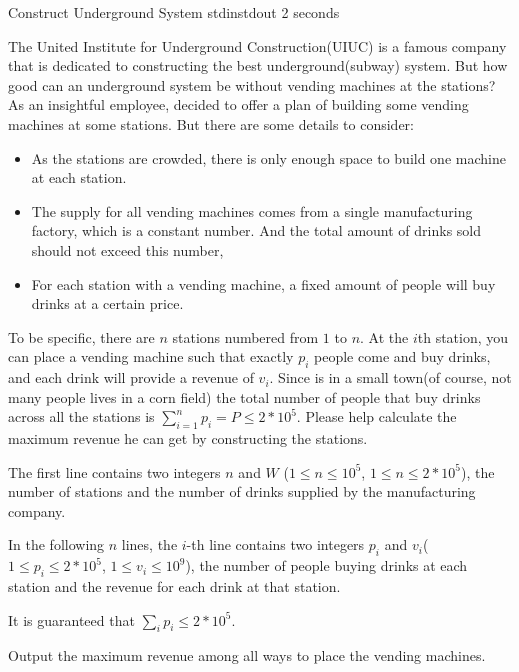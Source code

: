 \begin{problem}{Construct Underground System}
{stdin}{stdout}
{2 seconds}{}{}

The United Institute for Underground Construction(UIUC) is a famous company that is dedicated to constructing the best underground(subway) system. But how good can an underground system be without vending machines at the stations? As an insightful employee, \pittoresque decided to offer a plan of building some vending machines at some stations. But there are some details to consider:
\begin{itemize}
    \item As the stations are crowded, there is only enough space to build one machine at each station.
    \item The supply for all vending machines comes from a single manufacturing factory, which is a constant number. And the total amount of drinks sold should not exceed this number,
    \item For each station with a vending machine, a fixed amount of people will buy drinks at a certain price. 
\end{itemize}

To be specific, there are $n$ stations numbered from $1$ to $n$. At the $i$th station, you can place a vending machine such that exactly $p_i$ people come and buy drinks, and each drink will provide a revenue of $v_i$. Since \pittoresque is in a small town(of course, not many people lives in a corn field) the total number of people that buy drinks across all the stations is $\sum_{i=1}^n p_i = P \leq 2 * 10^5$. Please help \pittoresque calculate the maximum revenue he can get by constructing the stations. 

\InputFile

The first line contains two integers $n$ and $W$ ($1 \le n \le 10^5$, $1 \le n \le 2 * 10^5$), the number of stations and the number of  drinks supplied by the manufacturing company.

In the following $n$ lines, the $i$-th line contains two integers $p_i$ and $v_i$($1 \le p_i \le 2 * 10^5$, $1 \le v_i \le 10^9$), the number of people buying drinks at each station and the revenue for each drink at that station.

It is guaranteed that $\sum_i p_i \leq 2 * 10^5$.

\OutputFile

Output the maximum revenue among all ways to place the vending machines.

\Examples

\begin{example}
%
\end{example}

\begin{example}
%
\end{example}



\end{problem}